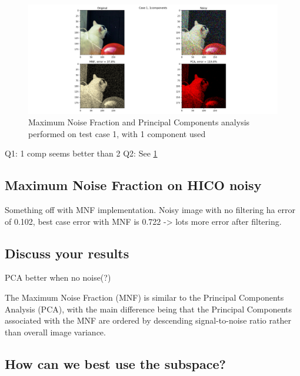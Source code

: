 \begin{figure}
    \centering
    \includegraphics[width=\textwidth]{../fig/task_3_case_1_P_1}
    \caption{Maximum Noise Fraction and Principal Components analysis performed on test case 1, with 1 component used}
    \label{fig:mnf_test}
\end{figure}

Q1: 1 comp seems better than 2
Q2: See \cref{fig:mnf_test}

\subsection{Maximum Noise Fraction on HICO noisy}

Something off with MNF implementation. Noisy image with no filtering ha error of 0.102, 
best case error with MNF is 0.722 -> lots more error after filtering. 


\subsection{Discuss your results}

PCA better when no noise(?) 

The Maximum Noise Fraction (MNF) is similar to the Principal Components Analysis (PCA), 
with the main difference being that the Principal Components associated with the MNF are 
ordered by descending signal-to-noise ratio rather than overall image variance. 

\subsection{How can we best use the subspace?}
